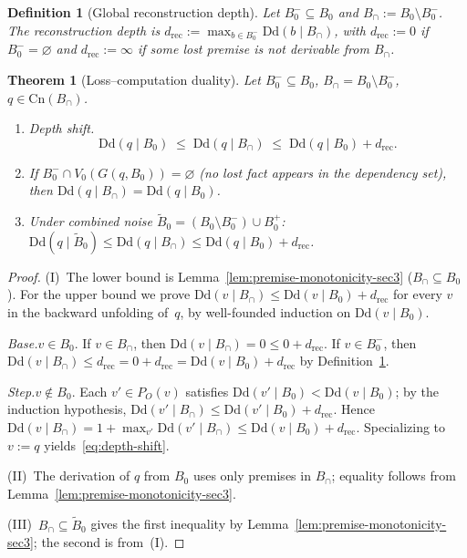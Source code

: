\documentclass[10pt,a4paper]{amsart}
\newtheorem{definition}{Definition}
\newtheorem{theorem}{Theorem}
\newcommand{\Cn}{\text{Cn}}
\newcommand{\Dd}{\text{Dd}}
\begin{document}
\begin{definition}[Global reconstruction depth]
\label{def:rec-depth-preserved}
Let $B_0^-\subseteq B_0$ and $B_\cap:=B_0\setminus B_0^-$.
The \emph{reconstruction depth} is
$d_{\mathrm{rec}}:=\max_{b\in B_0^-}\Dd(b\mid B_\cap)$,
with $d_{\mathrm{rec}}:=0$ if $B_0^-=\varnothing$ and
$d_{\mathrm{rec}}:=\infty$ if some lost premise is not
derivable from $B_\cap$.
\end{definition}

\begin{theorem}[Loss--computation duality]
\label{thm:loss-comp-duality}
Let $B_0^-\subseteq B_0$, $B_\cap=B_0\setminus B_0^-$,
$q\in\Cn(B_\cap)$.

\begin{enumerate}[label=\textup{(\Roman*)}]
\item \emph{Depth shift.}
\begin{equation}\label{eq:depth-shift}
  \Dd(q\mid B_0)
  \;\le\;
  \Dd(q\mid B_\cap)
  \;\le\;
  \Dd(q\mid B_0)+d_{\mathrm{rec}}.
\end{equation}

\item If $B_0^-\cap V_0(G(q,B_0))=\varnothing$
\textup{(no lost fact appears in the dependency set)}, then
$\Dd(q\mid B_\cap)=\Dd(q\mid B_0)$.

\item Under combined noise
$\tilde B_0=(B_0\setminus B_0^-)\cup B_0^+$:
$\Dd(q\mid\tilde B_0)\le\Dd(q\mid B_\cap)
 \le\Dd(q\mid B_0)+d_{\mathrm{rec}}$.
\end{enumerate}
\end{theorem}

\begin{proof}
(I)~The lower bound is
Lemma~\ref{lem:premise-monotonicity-sec3} ($B_\cap\subseteq B_0$).
For the upper bound we prove
$\Dd(v\mid B_\cap)\le\Dd(v\mid B_0)+d_{\mathrm{rec}}$
for every $v$ in the backward unfolding of~$q$,
by well-founded induction on $\Dd(v\mid B_0)$.

\emph{Base.}\;$v\in B_0$.
If $v\in B_\cap$, then
$\Dd(v\mid B_\cap)=0\le 0+d_{\mathrm{rec}}$.
If $v\in B_0^-$, then
$\Dd(v\mid B_\cap)\le d_{\mathrm{rec}}
 =0+d_{\mathrm{rec}}=\Dd(v\mid B_0)+d_{\mathrm{rec}}$
by Definition~\ref{def:rec-depth-preserved}.

\emph{Step.}\;$v\notin B_0$.
Each $v'\in P_O(v)$ satisfies
$\Dd(v'\mid B_0)<\Dd(v\mid B_0)$; by the induction
hypothesis,
$\Dd(v'\mid B_\cap)\le\Dd(v'\mid B_0)+d_{\mathrm{rec}}$.
Hence
$\Dd(v\mid B_\cap)
 =1+\max_{v'}\Dd(v'\mid B_\cap)
 \le\Dd(v\mid B_0)+d_{\mathrm{rec}}$.
Specializing to $v:=q$ yields~\eqref{eq:depth-shift}.

(II)~The derivation of $q$ from $B_0$ uses only premises in
$B_\cap$; equality follows from
Lemma~\ref{lem:premise-monotonicity-sec3}.

(III)~$B_\cap\subseteq\tilde B_0$ gives the first inequality by
Lemma~\ref{lem:premise-monotonicity-sec3}; the second is from~(I).
\end{proof}
\end{document}
